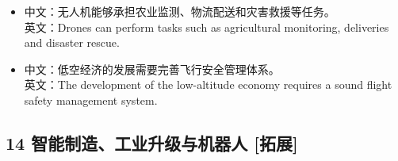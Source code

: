 \documentclass[a4paper,11pt,UTF8,fontset=none]{ctexart}
\begin{document}
\endgroup
\vspace{-2pt}

\par

\begin{itemize}[leftmargin=1.7em,itemsep=1pt,parsep=0pt,topsep=2pt]
\item \noindent 中文：无人机能够承担农业监测、物流配送和灾害救援等任务。\\ 英文：Drones can perform tasks such as agricultural monitoring, deliveries and disaster rescue.\par


\item \noindent 中文：低空经济的发展需要完善飞行安全管理体系。\\ 英文：The development of the low-altitude economy requires a sound flight safety management system.\par


\end{itemize}

\subsection{14 智能制造、工业升级与机器人 {\color{AccentBlue} [拓展]}}
\end{document}
